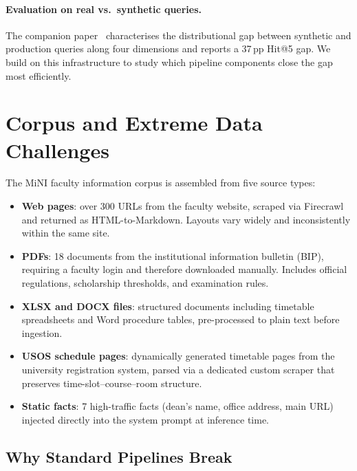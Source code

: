 \documentclass[sigconf,natbib=true]{acmart}
\begin{document}
\paragraph{Evaluation on real vs.\ synthetic queries.}
The companion paper~\cite{[COMPANION_PAPER]} characterises the distributional gap between synthetic and production queries along four dimensions and reports a 37\,pp Hit@5 gap.
We build on this infrastructure to study which pipeline components close the gap most efficiently.

\section{Corpus and Extreme Data Challenges}
\label{sec:corpus}

The MiNI faculty information corpus is assembled from five source types:

\begin{itemize}[topsep=2pt,itemsep=0pt]
  \item \textbf{Web pages}: over 300 URLs from the faculty website, scraped via Firecrawl~\cite{firecrawl} and returned as HTML-to-Markdown. Layouts vary widely and inconsistently within the same site.
  \item \textbf{PDFs}: 18 documents from the institutional information bulletin (BIP), requiring a faculty login and therefore downloaded manually. Includes official regulations, scholarship thresholds, and examination rules.
  \item \textbf{XLSX and DOCX files}: structured documents including timetable spreadsheets and Word procedure tables, pre-processed to plain text before ingestion.
  \item \textbf{USOS schedule pages}: dynamically generated timetable pages from the university registration system, parsed via a dedicated custom scraper that preserves time-slot--course--room structure.
  \item \textbf{Static facts}: 7 high-traffic facts (dean's name, office address, main URL) injected directly into the system prompt at inference time.
\end{itemize}

\subsection{Why Standard Pipelines Break}
\end{document}
